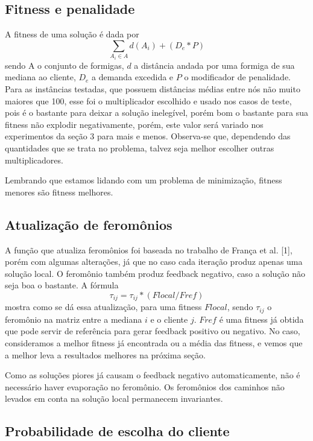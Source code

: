 \documentclass[11pt]{article}
\begin{document}
\subsection*{Fitness e penalidade}

A fitness de uma solução é dada por $$\sum_{A_i \in A}{d(A_i)} + (D_e * P)$$ sendo A o conjunto de formigas, $d$ a distância andada por uma formiga de sua mediana ao cliente, $D_e$ a demanda excedida e $P$ o modificador de penalidade. Para as instâncias testadas, que possuem distâncias médias entre nós não muito maiores que 100, esse foi o multiplicador escolhido e usado nos casos de teste, pois é o bastante para deixar a solução inelegível, porém bom o bastante para sua fitness não explodir negativamente, porém, este valor será variado nos experimentos da seção 3 para mais e menos. Observa-se que, dependendo das quantidades que se trata no problema, talvez seja melhor escolher outras multiplicadores.

Lembrando que estamos lidando com um problema de minimização, fitness menores são fitness melhores.

\subsection*{Atualização de feromônios}

A função que atualiza feromônios foi baseada no trabalho de França et al. [1], porém com algumas alterações, já que no caso cada iteração produz apenas uma solução local. O feromônio também produz feedback negativo, caso a solução não seja boa o bastante. A fórmula $$\tau_{ij} = \tau_{ij} * (F{local}/F{ref})$$ mostra como se dá essa atualização, para uma fitness $F{local}$, sendo $\tau_{ij}$ o feromônio na matriz entre a mediana $i$ e o cliente $j$. $F{ref}$ é uma fitness já obtida que pode servir de referência para gerar feedback positivo ou negativo. No caso, consideramos a melhor fitness já encontrada ou a média das fitness, e vemos que a melhor leva a resultados melhores na próxima seção.

Como as soluções piores já causam o feedback negativo automaticamente, não é necessário haver evaporação no feromônio. Os feromônios dos caminhos não levados em conta na solução local permanecem invariantes.

\subsection*{Probabilidade de escolha do cliente}
\end{document}

